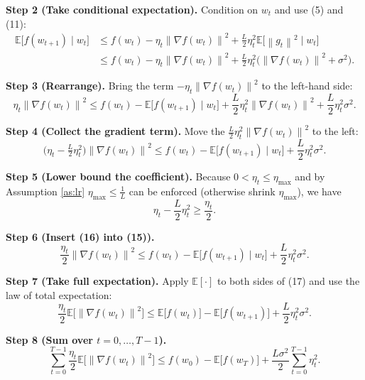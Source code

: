 \documentclass{article}
\newcommand{\E}{\mathbb{E}}
\newcommand{\norm}[1]{\left\lVert#1\right\rVert}
\begin{document}
\noindent\textbf{Step 2 (Take conditional expectation).}  
Condition on $w_{t}$ and use (5) and (11):
\[
\begin{aligned}
\E\!\bigl[f(w_{t+1})\mid w_{t}\bigr]
&\le f(w_{t})-\eta_{t}\norm{\nabla f(w_{t})}^{2}
   +\frac{L}{2}\eta_{t}^{2}\E\!\bigl[\norm{g_{t}}^{2}\mid w_{t}\bigr]   \\
&\le f(w_{t})-\eta_{t}\norm{\nabla f(w_{t})}^{2}
   +\frac{L}{2}\eta_{t}^{2}\bigl(\norm{\nabla f(w_{t})}^{2}+\sigma^{2}\bigr). \tag{13}
\end{aligned}
\]

\noindent\textbf{Step 3 (Rearrange).}  
Bring the term $-\eta_{t}\norm{\nabla f(w_{t})}^{2}$ to the left-hand side:
\[
\eta_{t}\norm{\nabla f(w_{t})}^{2}
\le f(w_{t})-\E\!\bigl[f(w_{t+1})\mid w_{t}\bigr]
   +\frac{L}{2}\eta_{t}^{2}\norm{\nabla f(w_{t})}^{2}
   +\frac{L}{2}\eta_{t}^{2}\sigma^{2}.                                 \tag{14}
\]

\noindent\textbf{Step 4 (Collect the gradient term).}  
Move the $\frac{L}{2}\eta_{t}^{2}\norm{\nabla f(w_{t})}^{2}$ to the left:
\[
\bigl(\eta_{t}-\tfrac{L}{2}\eta_{t}^{2}\bigr)\norm{\nabla f(w_{t})}^{2}
\le f(w_{t})-\E\!\bigl[f(w_{t+1})\mid w_{t}\bigr]
   +\frac{L}{2}\eta_{t}^{2}\sigma^{2}.                               \tag{15}
\]

\noindent\textbf{Step 5 (Lower bound the coefficient).}  
Because $0<\eta_{t}\le\eta_{\max}$ and by Assumption \ref{as:lr}
$\eta_{\max}\le\frac{1}{L}$ can be enforced (otherwise shrink $\eta_{\max}$),
we have
\[
\eta_{t}-\frac{L}{2}\eta_{t}^{2}\ge \frac{\eta_{t}}{2}.                \tag{16}
\]

\noindent\textbf{Step 6 (Insert (16) into (15)).}
\[
\frac{\eta_{t}}{2}\norm{\nabla f(w_{t})}^{2}
\le f(w_{t})-\E\!\bigl[f(w_{t+1})\mid w_{t}\bigr]
   +\frac{L}{2}\eta_{t}^{2}\sigma^{2}.                               \tag{17}
\]

\noindent\textbf{Step 7 (Take full expectation).}  
Apply $\E[\cdot]$ to both sides of (17) and use the law of total expectation:
\[
\frac{\eta_{t}}{2}\E\!\bigl[\norm{\nabla f(w_{t})}^{2}\bigr]
\le \E\!\bigl[f(w_{t})\bigr]-\E\!\bigl[f(w_{t+1})\bigr]
   +\frac{L}{2}\eta_{t}^{2}\sigma^{2}.                               \tag{18}
\]

\noindent\textbf{Step 8 (Sum over $t=0,\dots,T-1$).}
\[
\sum_{t=0}^{T-1}\frac{\eta_{t}}{2}\E\!\bigl[\norm{\nabla f(w_{t})}^{2}\bigr]
\le f(w_{0})- \E\!\bigl[f(w_{T})\bigr]
   +\frac{L\sigma^{2}}{2}\sum_{t=0}^{T-1}\eta_{t}^{2}.                \tag{19}
\]
\end{document}
